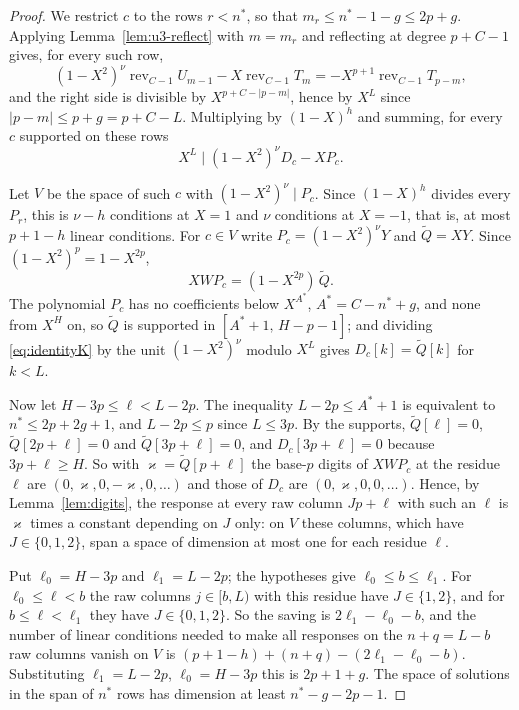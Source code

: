 \begin{proof}
We restrict $c$ to the rows $r<n^*$, so that $m_r\le n^*-1-g\le2p+g$. Applying Lemma~\ref{lem:u3-reflect}
with $m=m_r$ and reflecting at degree $p+C-1$ gives, for every such row,
\[
 (1-X^2)^\nu\operatorname{rev}_{C-1}U_{m-1}-X\operatorname{rev}_{C-1}T_m=-X^{p+1}\operatorname{rev}_{C-1}T_{p-m},
\]
and the right side is divisible by $X^{p+C-|p-m|}$, hence by $X^L$ since $|p-m|\le p+g=p+C-L$. Multiplying
by $(1-X)^h$ and summing, for every $c$ supported on these rows
\begin{equation}\label{eq:identityK}
 X^L\mid(1-X^2)^\nu D_c-XP_c .
\end{equation}

Let $V$ be the space of such $c$ with $(1-X^2)^\nu\mid P_c$. Since $(1-X)^h$ divides every $P_r$, this is
$\nu-h$ conditions at $X=1$ and $\nu$ conditions at $X=-1$, that is, at most $p+1-h$ linear conditions.
For $c\in V$ write $P_c=(1-X^2)^\nu Y$ and $\widetilde Q=XY$. Since $(1-X^2)^p=1-X^{2p}$,
\[
 XWP_c=(1-X^{2p})\,\widetilde Q .
\]
The polynomial $P_c$ has no coefficients below $X^{A^*}$, $A^*=C-n^*+g$, and none from $X^H$ on, so
$\widetilde Q$ is supported in $[A^*+1,\,H-p-1]$; and dividing \eqref{eq:identityK} by the unit
$(1-X^2)^\nu$ modulo $X^L$ gives $D_c[k]=\widetilde Q[k]$ for $k<L$.

Now let $H-3p\le\ell<L-2p$. The inequality $L-2p\le A^*+1$ is equivalent to $n^*\le2p+2g+1$, and
$L-2p\le p$ since $L\le3p$. By the supports, $\widetilde Q[\ell]=0$, $\widetilde Q[2p+\ell]=0$ and
$\widetilde Q[3p+\ell]=0$, and $D_c[3p+\ell]=0$ because $3p+\ell\ge H$. So with
$\varkappa=\widetilde Q[p+\ell]$ the base-$p$ digits of $XWP_c$ at the residue $\ell$ are
$(0,\varkappa,0,-\varkappa,0,\dots)$ and those of $D_c$ are $(0,\varkappa,0,0,\dots)$. Hence, by
Lemma~\ref{lem:digits}, the response at every raw column $Jp+\ell$ with such an $\ell$ is $\varkappa$ times
a constant depending on $J$ only: on $V$ these columns, which have $J\in\{0,1,2\}$, span a space of
dimension at most one for each residue $\ell$.

Put $\ell_0=H-3p$ and $\ell_1=L-2p$; the hypotheses give $\ell_0\le b\le\ell_1$. For $\ell_0\le\ell<b$ the raw
columns $j\in[b,L)$ with this residue have $J\in\{1,2\}$, and for $b\le\ell<\ell_1$ they have
$J\in\{0,1,2\}$. So the saving is $2\ell_1-\ell_0-b$, and the number of linear conditions needed to make all
responses on the $n+q=L-b$ raw columns vanish on $V$ is
$(p+1-h)+(n+q)-(2\ell_1-\ell_0-b)$. Substituting $\ell_1=L-2p$, $\ell_0=H-3p$ this is $2p+1+g$. The space of
solutions in the span of $n^*$ rows has dimension at least $n^*-g-2p-1$.
\end{proof}

